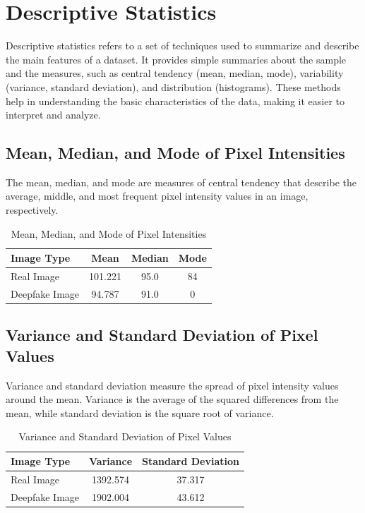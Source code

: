 \documentclass{article}
\begin{document}
\section{Descriptive Statistics}
Descriptive statistics refers to a set of techniques used to summarize and describe the main features of a dataset. It provides simple summaries about the sample and the measures, such as central tendency (mean, median, mode), variability (variance, standard deviation), and distribution (histograms). These methods help in understanding the basic characteristics of the data, making it easier to interpret and analyze.

\subsection{Mean, Median, and Mode of Pixel Intensities}
The mean, median, and mode are measures of central tendency that describe the average, middle, and most frequent pixel intensity values in an image, respectively.

\begin{table}[h!]
    \centering
    \begin{tabular}{lccc}
        \toprule
        \textbf{Image Type} & \textbf{Mean} & \textbf{Median} & \textbf{Mode} \\
        \midrule
        Real Image & 101.221 & 95.0 & 84 \\
        Deepfake Image & 94.787 & 91.0 & 0 \\
        \bottomrule
    \end{tabular}
    \caption{Mean, Median, and Mode of Pixel Intensities}
    \label{tab:mean_median_mode}
\end{table}

\subsection{Variance and Standard Deviation of Pixel Values}
Variance and standard deviation measure the spread of pixel intensity values around the mean. Variance is the average of the squared differences from the mean, while standard deviation is the square root of variance.

\begin{table}[h!]
    \centering
    \begin{tabular}{lcc}
        \toprule
        \textbf{Image Type} & \textbf{Variance} & \textbf{Standard Deviation} \\
        \midrule
        Real Image & 1392.574 & 37.317 \\
        Deepfake Image & 1902.004 & 43.612 \\
        \bottomrule
    \end{tabular}
    \caption{Variance and Standard Deviation of Pixel Values}
    \label{tab:variance_std}
\end{table}
\end{document}
